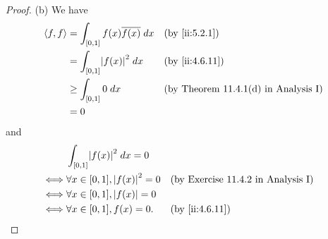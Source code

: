 \begin{proof}{(b)}
  We have
  \begin{align*}
    \inner*{f, f} & = \int_{[0, 1]} f(x) \overline{f(x)} \; dx &  & \by{ii:5.2.1}                               \\
                  & = \int_{[0, 1]} \abs{f(x)}^2 \; dx         &  & \by{ii:4.6.11}                              \\
                  & \geq \int_{[0, 1]} 0 \; dx                 &  & \text{(by Theorem 11.4.1(d) in Analysis I)} \\
                  & = 0
  \end{align*}
  and
  \begin{align*}
         & \int_{[0, 1]} \abs{f(x)}^2 \; dx = 0                                                  \\
    \iff & \forall x \in [0, 1], \abs{f(x)}^2 = 0 &  & \text{(by Exercise 11.4.2 in Analysis I)} \\
    \iff & \forall x \in [0, 1], \abs{f(x)} = 0                                                  \\
    \iff & \forall x \in [0, 1], f(x) = 0.        &  & \by{ii:4.6.11}
  \end{align*}
\end{proof}

